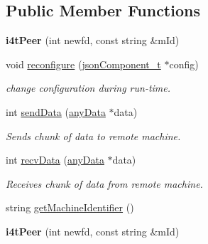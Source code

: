 \subsection*{\-Public \-Member \-Functions}
\begin{DoxyCompactItemize}
\item 
\hypertarget{classi4tPeer_a0e88379cf5ba72a5d4abe779317ee03c}{{\bfseries i4t\-Peer} (int newfd, const string \&m\-Id)}\label{classi4tPeer_a0e88379cf5ba72a5d4abe779317ee03c}

\item 
void \hyperlink{classi4tPeer_a38da8c7962f2df5440d3f89760f143b3}{reconfigure} (\hyperlink{classjsonComponent__t}{json\-Component\-\_\-t} $\ast$config)
\begin{DoxyCompactList}\small\item\em change configuration during run-\/time. \end{DoxyCompactList}\item 
int \hyperlink{classi4tPeer_a18ee51283a0bbdb4d259da9214e36e72}{send\-Data} (\hyperlink{structanyData}{any\-Data} $\ast$data)
\begin{DoxyCompactList}\small\item\em \-Sends chunk of data to remote machine. \end{DoxyCompactList}\item 
int \hyperlink{classi4tPeer_abb4e36b280ca1b8e75f37f2b7a6ed2e4}{recv\-Data} (\hyperlink{structanyData}{any\-Data} $\ast$data)
\begin{DoxyCompactList}\small\item\em \-Receives chunk of data from remote machine. \end{DoxyCompactList}\item 
string \hyperlink{classi4tPeer_ad1e2bec5c215116c5fe662a64a13335f}{get\-Machine\-Identifier} ()
\item 
\hypertarget{classi4tPeer_a0e88379cf5ba72a5d4abe779317ee03c}{{\bfseries i4t\-Peer} (int newfd, const string \&m\-Id)}\label{classi4tPeer_a0e88379cf5ba72a5d4abe779317ee03c}


\end{DoxyCompactItemize}
